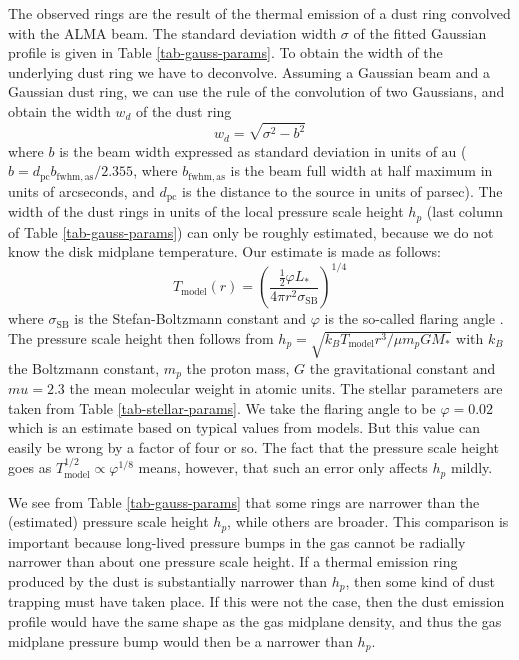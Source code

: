\documentclass{aa}
\begin{document}
The observed rings are the result of the thermal emission of a dust ring convolved
with the ALMA beam. The standard deviation width $\sigma$ of the fitted Gaussian
profile is given in Table \ref{tab-gauss-params}.  To obtain the width of the
underlying dust ring we have to deconvolve. Assuming a Gaussian beam and a
Gaussian dust ring, we can use the rule of the convolution of two Gaussians, and
obtain the width $w_d$ of the dust ring
\begin{equation}
w_d=\sqrt{\sigma^2-b^2}
\end{equation}
where $b$ is the beam width expressed as standard deviation in units of
$\mathrm{au}$ ($b=d_{\mathrm{pc}}b_{\mathrm{fwhm,as}}/2.355$, where
$b_{\mathrm{fwhm,as}}$ is the beam full width at half maximum in units of
arcseconds, and $d_{\mathrm{pc}}$ is the distance to the source in units of
parsec). The width of the dust rings
in units of the local pressure scale height $h_p$ (last column of Table
\ref{tab-gauss-params}) can only be roughly estimated, because we do not know
the disk midplane temperature. Our estimate is made as follows:
\begin{equation}\label{eq-disk-temperature-model}
T_{\mathrm{model}}(r) = \left(\frac{\tfrac{1}{2}\varphi L_{*}}{4\pi r^2\sigma_{\mathrm{SB}}}\right)^{1/4}
\end{equation}
where $\sigma_{\mathrm{SB}}$ is the Stefan-Boltzmann constant and $\varphi$ is
the so-called flaring angle \citep[e.g.][]{1997ApJ...490..368C,
  1998ApJ...500..411D, 2001ApJ...560..957D}. The pressure scale height then
follows from $h_p=\sqrt{k_BT_{\mathrm{model}}r^3/\mu m_pGM_{*}}$ with $k_B$ the
Boltzmann constant, $m_p$ the proton mass, $G$ the gravitational constant and
$mu=2.3$ the mean molecular weight in atomic units. The stellar parameters are
taken from Table \ref{tab-stellar-params}. We take the flaring angle to be
$\varphi=0.02$ which is an estimate based on typical values from models.  But
this value can easily be wrong by a factor of four or so. The fact that the
pressure scale height goes as $T_{\mathrm{model}}^{1/2}\propto \varphi^{1/8}$
means, however, that such an error only affects $h_p$ mildly.

We see from Table \ref{tab-gauss-params} that some rings are narrower than the
(estimated) pressure scale height $h_p$, while others are broader. This
comparison is important because long-lived pressure bumps in the gas cannot be
radially narrower than about one pressure scale height. If a thermal emission
ring produced by the dust is substantially narrower than $h_p$, then some kind
of dust trapping must have taken place. If this were not the case, then the dust
emission profile would have the same shape as the gas midplane density, and thus
the gas midplane pressure bump would then be a narrower than $h_p$. 
\end{document}
